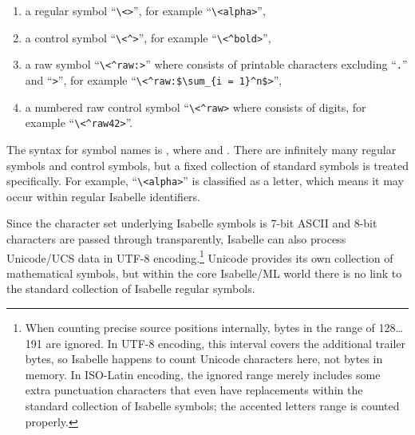 \begin{isabellebody}
\begin{isamarkuptext}
\begin{enumerate}
  \item a regular symbol ``\verb,\,\verb,<,\verb,>,'',
  for example ``\verb,\,\verb,<alpha>,'',

  \item a control symbol ``\verb,\,\verb,<^,\verb,>,'',
  for example ``\verb,\,\verb,<^bold>,'',

  \item a raw symbol ``\verb,\,\verb,<^raw:,\verb,>,''
  where  consists of printable characters excluding
  ``\verb,.,'' and ``\verb,>,'', for example
  ``\verb,\,\verb,<^raw:$\sum_{i = 1}^n$>,'',

  \item a numbered raw control symbol ``\verb,\,\verb,<^raw,\verb,>, where  consists of digits, for example
  ``\verb,\,\verb,<^raw42>,''.

  \end{enumerate}

  \noindent The  syntax for symbol names is , where  and .  There are infinitely many
  regular symbols and control symbols, but a fixed collection of
  standard symbols is treated specifically.  For example,
  ``\verb,\,\verb,<alpha>,'' is classified as a letter, which means it
  may occur within regular Isabelle identifiers.

  Since the character set underlying Isabelle symbols is 7-bit ASCII
  and 8-bit characters are passed through transparently, Isabelle can
  also process Unicode/UCS data in UTF-8 encoding.\footnote{When
  counting precise source positions internally, bytes in the range of
  128\dots 191 are ignored.  In UTF-8 encoding, this interval covers
  the additional trailer bytes, so Isabelle happens to count Unicode
  characters here, not bytes in memory.  In ISO-Latin encoding, the
  ignored range merely includes some extra punctuation characters that
  even have replacements within the standard collection of Isabelle
  symbols; the accented letters range is counted properly.} Unicode
  provides its own collection of mathematical symbols, but within the
  core Isabelle/ML world there is no link to the standard collection
  of Isabelle regular symbols.


\end{isamarkuptext}
\end{isabellebody}
